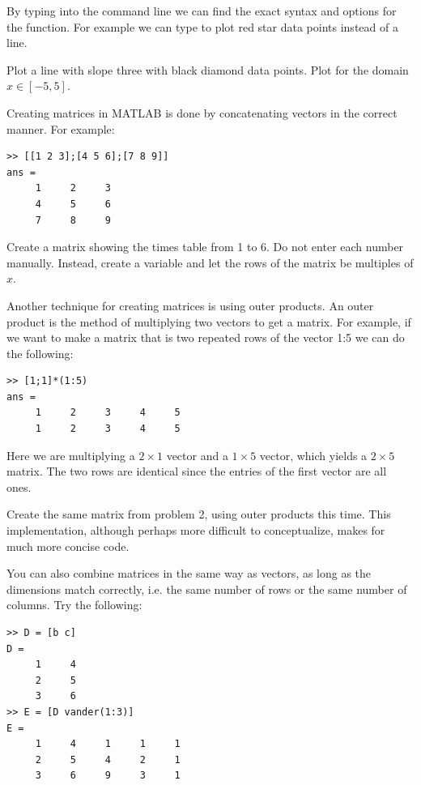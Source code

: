 By typing  into the command line we can find the exact syntax and options for the  function. For example we can type  to plot red star data points instead of a line.

\begin{problem}
Plot a line with slope three with black diamond data points. Plot for the domain $x \in [-5,5]$. 
\end{problem}

Creating matrices in MATLAB is done by concatenating vectors in the correct manner. For example:

\begin{lstlisting}[style=matlab]
>> [[1 2 3];[4 5 6];[7 8 9]]
ans =
     1     2     3
     4     5     6
     7     8     9
\end{lstlisting}

\begin{problem}
Create a matrix showing the times table from 1 to 6. Do not enter each number manually. Instead, create a variable  and let the rows of the matrix be multiples of $x$.
\end{problem}

Another technique for creating matrices is using outer products. An outer product is the method of multiplying two vectors to get a matrix. For example, if we want to make a matrix that is two repeated rows of the vector 1:5 we can do the following:

\begin{lstlisting}[style=matlab]
>> [1;1]*(1:5)
ans =
     1     2     3     4     5
     1     2     3     4     5
\end{lstlisting}

Here we are multiplying a $2 \times 1$ vector and a $1 \times 5$ vector, which yields a $2 \times 5$ matrix. The two rows are identical since the entries of the first vector are all ones.

\begin{problem}
Create the same matrix from problem 2, using outer products this time. This implementation, although perhaps more difficult to conceptualize, makes for much more concise code.
\end{problem}

You can also combine matrices in the same way as vectors, as long as the dimensions match correctly, i.e. the same number of rows or the same number of columns. Try the following:

\begin{lstlisting}[style=matlab]
>> D = [b c]
D =
     1     4
     2     5
     3     6
>> E = [D vander(1:3)]
E =
     1     4     1     1     1
     2     5     4     2     1
     3     6     9     3     1  
\end{lstlisting}

